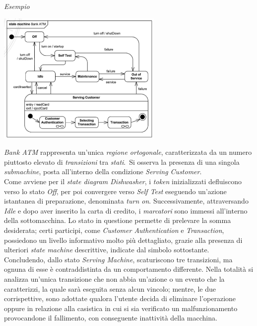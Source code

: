 \documentclass{article}
\begin{document}
\textit{Esempio}\vspace*{7pt}
\begin{center}
    \includegraphics*[width=0.6\textwidth]{foto 6.png}
\end{center}
\textit{Bank ATM} rappresenta un'unica \textit{regione ortogonale}, caratterizzata da un numero piuttosto elevato di \textit{transizioni} tra \textit{stati}.\ Si osserva la presenza di una singola \textit{submachine}, posta all'interno della condizione \textit{Serving Customer}.\vspace*{14pt}\\
Come avviene per il \textit{state diagram Dishwasher}, i \textit{token} inizializzati defluiscono verso lo stato \textit{Off}, per poi convergere verso \textit{Self Test} eseguendo un'azione istantanea di preparazione, denominata \textit{turn on}. Successivamente, attraversando \textit{Idle} e dopo aver inserito la carta di credito, i \textit{marcatori} sono immessi all'interno della sottomacchina. Lo stato in questione permette di prelevare la somma desiderata; certi participi, come \textit{Customer Authentication} e  \textit{Transaction}, possiedono un livello informativo molto più dettagliato, grazie alla presenza di ulteriori \textit{state machine} descrittive, indicate dal simbolo sottostante.\vspace*{14pt}\\
Concludendo, dallo stato \textit{Serving Machine}, scaturiscono tre transizioni, ma ognuna di esse è contraddistinta da un comportamento differente. Nella totalità si analizza un'unica transizione che non abbia un'azione o un evento che la caratterizzi, la quale sarà eseguita senza alcun vincolo; mentre, le due corrispettive, sono adottate qualora l'utente decida di eliminare l'operazione oppure in relazione alla casistica in cui si sia verificato un malfunzionamento provocandone il fallimento, con conseguente inattività della macchina.
\end{document}
